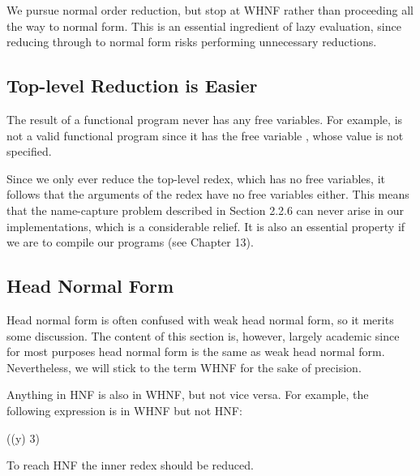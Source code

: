 We pursue normal order reduction, but stop at WHNF rather than
proceeding all the way to normal form. This is an essential ingredient of lazy
evaluation, since reducing through to normal form risks performing unnecessary reductions.

\subsection{Top-level Reduction is Easier}

The result of a functional program never has any free variables. For example,
 is not a valid functional program since it has the free variable , whose
value is not specified.

Since we only ever reduce the top-level redex, which has no free variables,
it follows that the arguments of the redex have no free variables either. This
means that the name-capture problem described in Section 2.2.6 can never
arise in our implementations, which is a considerable relief. It is also an
essential property if we are to compile our programs (see Chapter 13).

\subsection{Head Normal Form}

Head normal form is often confused with weak head normal form, so it merits
some discussion. The content of this section is, however, largely academic
since for most purposes head normal form is the same as weak head normal
form. Nevertheless, we will stick to the term WHNF for the sake of precision.


\noindent
Anything in HNF is also in WHNF, but not vice versa. For example, the
following expression is in WHNF but not HNF:
\begin{mlcoded}
    ((y) 3)
\end{mlcoded}
To reach HNF the inner redex should be reduced.

